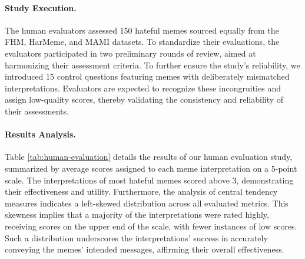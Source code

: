 \paragraph{Study Execution.}

The human evaluators assessed 150 hateful memes sourced equally from the FHM, HarMeme, and MAMI datasets. To standardize their evaluations, the evaluators participated in two preliminary rounds of review, aimed at harmonizing their assessment criteria. To further ensure the study's reliability, we introduced 15 control questions featuring memes with deliberately mismatched interpretations. Evaluators are expected to recognize these incongruities and assign low-quality scores, thereby validating the consistency and reliability of their assessments.


\paragraph{Results Analysis.}

Table \ref{tab:human-evaluation} details the results of our human evaluation study, summarized by average scores assigned to each meme interpretation on a 5-point scale. The interpretations of most hateful memes scored above 3, demonstrating their effectiveness and utility. Furthermore, the analysis of central tendency measures indicates a left-skewed distribution across all evaluated metrics. This skewness implies that a majority of the interpretations were rated highly, receiving scores on the upper end of the scale, with fewer instances of low scores. Such a distribution underscores the interpretations' success in accurately conveying the memes' intended messages, affirming their overall effectiveness.


